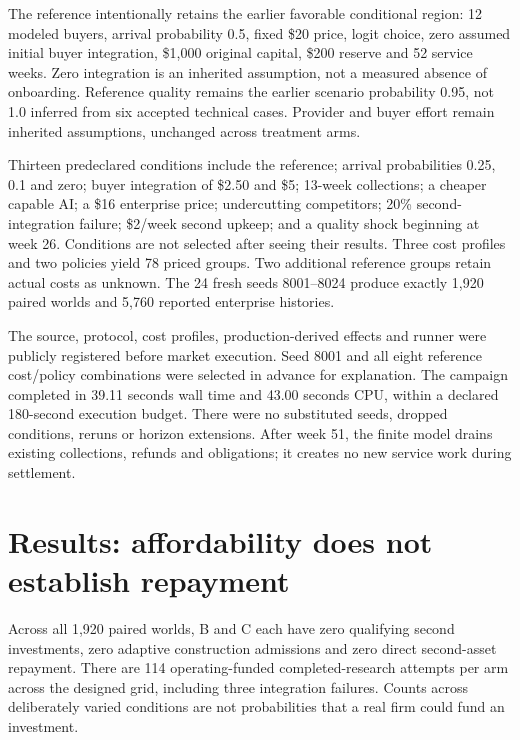 \documentclass[11pt,letterpaper]{article}
\newcommand{\USD}[1]{\$#1}
\begin{document}
The reference intentionally retains the earlier favorable conditional region: 12 modeled buyers, arrival probability 0.5, fixed \USD{20} price, logit choice, zero assumed initial buyer integration, \USD{1,000} original capital, \USD{200} reserve and 52 service weeks. Zero integration is an inherited assumption, not a measured absence of onboarding. Reference quality remains the earlier scenario probability 0.95, not 1.0 inferred from six accepted technical cases. Provider and buyer effort remain inherited assumptions, unchanged across treatment arms.

Thirteen predeclared conditions include the reference; arrival probabilities 0.25, 0.1 and zero; buyer integration of \USD{2.50} and \USD{5}; 13-week collections; a cheaper capable AI; a \USD{16} enterprise price; undercutting competitors; 20\% second-integration failure; \USD{2}/week second upkeep; and a quality shock beginning at week 26. Conditions are not selected after seeing their results. Three cost profiles and two policies yield 78 priced groups. Two additional reference groups retain actual costs as unknown. The 24 fresh seeds 8001--8024 produce exactly 1,920 paired worlds and 5,760 reported enterprise histories.

The source, protocol, cost profiles, production-derived effects and runner were publicly registered before market execution. Seed 8001 and all eight reference cost/policy combinations were selected in advance for explanation. The campaign completed in 39.11 seconds wall time and 43.00 seconds CPU, within a declared 180-second execution budget. There were no substituted seeds, dropped conditions, reruns or horizon extensions. After week 51, the finite model drains existing collections, refunds and obligations; it creates no new service work during settlement.

\section{Results: affordability does not establish repayment}

Across all 1,920 paired worlds, B and C each have zero qualifying second investments, zero adaptive construction admissions and zero direct second-asset repayment. There are 114 operating-funded completed-research attempts per arm across the designed grid, including three integration failures. Counts across deliberately varied conditions are not probabilities that a real firm could fund an investment.
\end{document}

